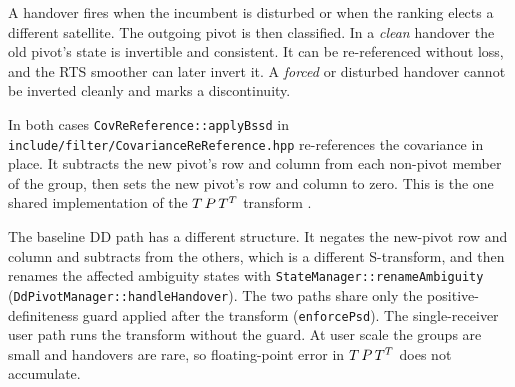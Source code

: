 \documentclass[main.tex]{subfiles}
\begin{document}
A handover fires when the incumbent is disturbed or when the ranking
elects a different satellite.  The outgoing pivot is then classified.  In
a \emph{clean} handover the old pivot's state is invertible and
consistent.  It can be re-referenced without loss, and the RTS smoother
can later invert it.  A \emph{forced} or disturbed handover cannot be
inverted cleanly and marks a discontinuity.

In both cases \texttt{CovReReference::applyBssd} in
\texttt{include/filter/CovarianceReReference.hpp} re-references the
covariance in place.  It subtracts the new pivot's row and column from
each non-pivot member of the group, then sets the new pivot's row and
column to zero.  This is the one shared implementation of the
$T\,P\,T^{T}$ transform
.

The baseline DD path has a different structure.  It negates the
new-pivot row and column and subtracts from the others, which is a
different S-transform, and then renames the affected ambiguity states
with \texttt{StateManager::renameAmbiguity}
(\texttt{DdPivotManager::handleHandover}).  The two paths share only the
positive-definiteness guard applied after the transform
(\texttt{enforcePsd}).  The single-receiver user path runs the transform
without the guard.  At user scale the groups are small and handovers are
rare, so floating-point error in
$T\,P\,T^{T}$ does not accumulate.

\ifSubfilesClassLoaded{\printbibliography}{}
\end{document}
